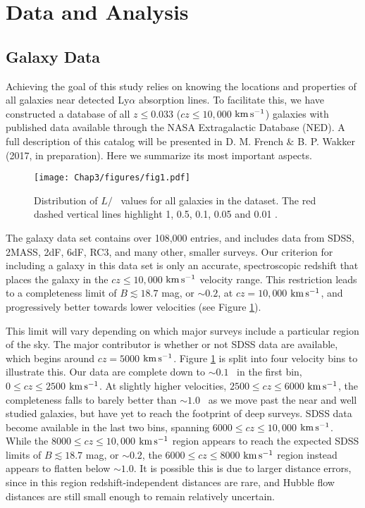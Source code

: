 \section{Data and Analysis}

\subsection{Galaxy Data}
Achieving the goal of this study relies on knowing the locations and properties of all galaxies near detected Ly$\alpha$ absorption lines. To facilitate this, we have constructed a database of all $z\leq 0.033$ ($cz\leq 10,000$ $\rm km\, s^{-1}$) galaxies with published data available through the NASA Extragalactic Database (NED). A full description of this catalog will be presented in D. M. French $\&$ B. P. Wakker (2017, in preparation). Here we summarize its most important aspects.

\begin{figure}[b!]
        \centering
        \vspace{0pt}
        \texttt{[image: Chap3/figures/fig1.pdf]}
        \caption{\small{Distribution of $L/$\Lstar~ values for all galaxies in the dataset. The red dashed vertical lines highlight 1, 0.5, 0.1, 0.05 and 0.01 \Lstar.}}
        \label{completeness}
\end{figure} 

The galaxy data set contains over 108,000 entries, and includes data from SDSS, 2MASS, 2dF, 6dF, RC3, and many other, smaller surveys. Our criterion for including a galaxy in this data set is only an accurate, spectroscopic redshift that places the galaxy in the $cz \leq 10,000$ $\rm km\, s^{-1}$ velocity range. This restriction leads to a completeness limit of $B \lesssim 18.7$ mag, or $\sim0.2 $\Lstar, at $cz = 10,000$ $\rm km\, s^{-1}$, and progressively better towards lower velocities (see Figure \ref{completeness}). 

This limit will vary depending on which major surveys include a particular region of the sky. The major contributor is whether or not SDSS data are available, which begins around $cz = 5000$ $\rm km\, s^{-1}$. Figure \ref{completeness} is split into four velocity bins to illustrate this. Our data are complete down to $\sim0.1$\Lstar~ in the first bin, $0 \leq cz \leq 2500$ $\rm km\, s^{-1}$. At slightly higher velocities, $2500 \leq cz \leq 6000$ $\rm km\, s^{-1}$, the completeness falls to barely better than $\sim1.0$\Lstar~ as we move past the near and well studied galaxies, but have yet to reach the footprint of deep surveys. SDSS data become available in the last two bins, spanning $6000 \leq cz \leq 10,000$ $\rm km\, s^{-1}$. While the $8000 \leq cz \leq 10,000$ $\rm km\, s^{-1}$ region appears to reach the expected SDSS limits of $B \lesssim 18.7$ mag, or $\sim0.2$\Lstar, the $6000 \leq cz \leq 8000$ $\rm km\, s^{-1}$ region instead appears to flatten below $\sim 1.0$\Lstar. It is possible this is due to larger distance errors, since in this region redshift-independent distances are rare, and Hubble flow distances are still small enough to remain relatively uncertain.

